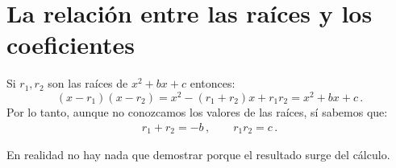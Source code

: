 \section{La relación entre las raíces y los coeficientes}\label{s.computing}

\begin{theorem}\label{thm.roots-coefficients}
Si $r_1,r_2$ son las raíces de $x^2+bx+c$ entonces:
\[
(x-r_1)(x-r_2)=x^2 - (r_1+r_2)x + r_1r_2=x^2+bx+c\,.
\]
Por lo tanto, aunque no conozcamos los valores de las raíces, sí sabemos que:
\begin{align}\label{eq.viete-quad}
r_1+r_2 = -b\,,\quad\quad r_1r_2=c\,.
\end{align}
\end{theorem}
En realidad no hay nada que demostrar porque el resultado surge del cálculo.

